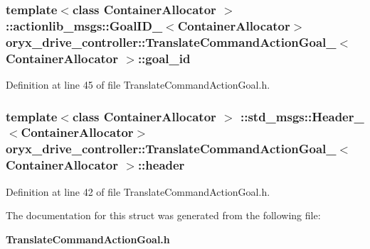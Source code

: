 \subsubsection[{goal\-\_\-id}]{\setlength{\rightskip}{0pt plus 5cm}template$<$class Container\-Allocator $>$ \-::actionlib\-\_\-msgs\-::\-Goal\-I\-D\-\_\-$<$\-Container\-Allocator$>$ {\bf oryx\-\_\-drive\-\_\-controller\-::\-Translate\-Command\-Action\-Goal\-\_\-}$<$ \-Container\-Allocator $>$\-::{\bf goal\-\_\-id}}\label{structoryx__drive__controller_1_1TranslateCommandActionGoal___a67dffe345c1a25f8a305211e9afd88d3}


\-Definition at line 45 of file \-Translate\-Command\-Action\-Goal.\-h.

\subsubsection[{header}]{\setlength{\rightskip}{0pt plus 5cm}template$<$class Container\-Allocator $>$ \-::std\-\_\-msgs\-::\-Header\-\_\-$<$\-Container\-Allocator$>$ {\bf oryx\-\_\-drive\-\_\-controller\-::\-Translate\-Command\-Action\-Goal\-\_\-}$<$ \-Container\-Allocator $>$\-::{\bf header}}\label{structoryx__drive__controller_1_1TranslateCommandActionGoal___ac60e6b9ec6b41e2df7d9fa852b699b78}


\-Definition at line 42 of file \-Translate\-Command\-Action\-Goal.\-h.



\-The documentation for this struct was generated from the following file\-:\begin{DoxyCompactItemize}
\item 
{\bf \-Translate\-Command\-Action\-Goal.\-h}\end{DoxyCompactItemize}
